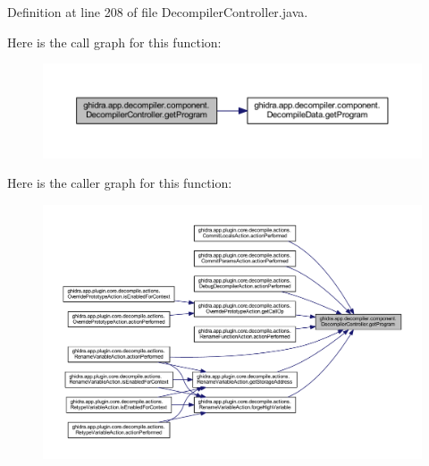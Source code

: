 Definition at line 208 of file Decompiler\+Controller.\+java.

Here is the call graph for this function\+:
\nopagebreak
\begin{figure}[H]
\begin{center}
\leavevmode
\includegraphics[width=350pt]{classghidra_1_1app_1_1decompiler_1_1component_1_1_decompiler_controller_a8ac46f8ce844a53344fc6ccf60f0eee4_cgraph}
\end{center}
\end{figure}
Here is the caller graph for this function\+:
\nopagebreak
\begin{figure}[H]
\begin{center}
\leavevmode
\includegraphics[width=350pt]{classghidra_1_1app_1_1decompiler_1_1component_1_1_decompiler_controller_a8ac46f8ce844a53344fc6ccf60f0eee4_icgraph}
\end{center}
\end{figure}
\mbox{\label{classghidra_1_1app_1_1decompiler_1_1component_1_1_decompiler_controller_a32d5c19b45f461f61f98f076ac043c63}} 
